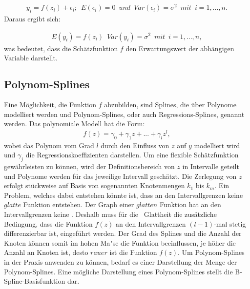 \documentclass[12pt]{scrreprt}
\begin{document}
	\begin{align}
	y_{i}=f(z_{i})+\epsilon_{i};\enspace E(\epsilon_{i})=0 \enspace und \enspace Var(\epsilon_{i})=\sigma^2 \enspace mit \enspace i=1,...,n.
	\end{align}
	Daraus ergibt sich:
	
	\begin{align}
	E(y_{i})=f(z_{i}) \enspace Var(y_{i})=\sigma^2 \enspace mit \enspace i=1,...,n,
	\end{align}
	was bedeutet, dass die Schätzfunktion $f$ den Erwartungswert der abhängigen Variable darstellt.
	
	\subsection{Polynom-Splines}
	
	Eine Möglichkeit, die Funktion $f$ abzubilden, sind Splines, die über Polynome modelliert werden und Polynom-Splines, oder auch Regressions-Splines, genannt werden. Das polynomiale Modell hat die Form: 
	\begin{align}
	f(z)=\gamma_{0}+\gamma_{1}z+...+\gamma_{l}z^l,
	\end{align}
	wobei das Polynom vom Grad $l$ durch den Einfluss von $z$ auf $y$ modelliert wird und $\gamma_{j}$ die Regressionskoeffizienten darstellen. Um eine flexible Schätzfunktion gewährleisten zu können, wird der Definitionsbereich von $z$ in Intervalle geteilt und Polynome werden für das jeweilige Intervall geschätzt. Die Zerlegung von $z$ erfolgt stückweise auf Basis von sogenannten Knotenmengen $k_{1}$ bis $k_{m}$.  Ein Problem, welches dabei entstehen könnte ist, dass an den Intervallgrenzen keine $glatte$ Funktion entstehen. Der Graph einer $glatten$ Funktion hat an den Intervallgrenzen keine . Deshalb muss für die \grqq ~Glattheit die zusätzliche Bedingung, dass die Funktion $f(z)$ an den Intervallgrenzen $(l-1)$-mal stetig differenzierbar ist, eingeführt werden. Der Grad des Splines und die Anzahl der Knoten können somit im hohen Ma"se die Funktion beeinflussen, je höher die Anzahl an Knoten ist, desto $rauer$ ist die Funktion $f(z)$. Um Polynom-Splines in der Praxis anwenden zu können, bedarf es einer Darstellung der Menge der Polynom-Splines. Eine mögliche Darstellung eines Polynom-Splines stellt die B-Spline-Basisfunktion dar.
	
\end{document}
